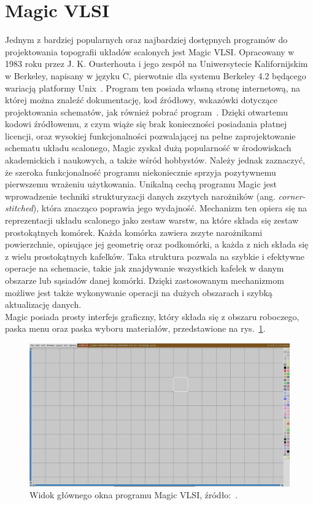 \section{Magic VLSI}

Jednym z bardziej popularnych oraz najbardziej dostępnych programów do projektowania topografii układów scalonych
jest Magic VLSI\@.
Opracowany w 1983 roku przez J. K. Ousterhouta i jego zespół na Uniwersytecie Kalifornijskim w Berkeley,
napisany w języku C, pierwotnie dla systemu Berkeley 4.2 będącego wariacją platformy Unix~\cite{MAGIC_article}.
Program ten posiada własną stronę internetową, na której można znaleźć dokumentację, kod źródłowy,
wskazówki dotyczące projektowania schematów, jak również pobrać program~\cite{MAGIC_site}.
Dzięki otwartemu kodowi źródłowemu, z czym wiąże się brak konieczności posiadania płatnej licencji,
oraz wysokiej funkcjonalności pozwalającej na pełne zaprojektowanie schematu układu scalonego,
Magic zyskał dużą popularność
w środowiskach akademickich i naukowych, a także wśród hobbystów.
Należy jednak zaznaczyć, że szeroka funkcjonalność programu
niekoniecznie sprzyja pozytywnemu pierwszemu wrażeniu użytkowania. %
\newpage
\indent Unikalną cechą programu Magic jest wprowadzenie techniki strukturyzacji danych
zszytych narożników (ang. \textit{corner-stitched}),
która znacząco poprawia jego wydajność.
Mechanizm ten opiera się na reprezentacji układu scalonego jako zestaw warstw,
na które składa się zestaw prostokątnych komórek.
Każda komórka zawiera zszyte narożnikami powierzchnie,
opisujące jej geometrię oraz podkomórki, a każda z nich składa się z wielu prostokątnych kafelków.
Taka struktura pozwala na szybkie i efektywne operacje na schemacie,
takie jak znajdywanie wszystkich kafelek w danym obszarze lub sąsiadów danej komórki.
Dzięki zastosowanym mechanizmom możliwe jest także wykonywanie operacji na dużych obszarach
i szybką aktualizację danych.\\
\indent Magic posiada prosty interfejs graficzny,
który składa się z obszaru roboczego, paska menu oraz paska wyboru materiałów,
przedstawione na rys.~\ref{fig:magic_okno}.

\begin{figure}[h]
    \centering
    \includegraphics[width=.9\textwidth]{chapters/chapter2/img/magic_okno}
    \caption[Widok głównego okna programu Magic VLSI.]{Widok głównego okna programu Magic VLSI, źródło:~\cite{MAGIC_site}.}
    \label{fig:magic_okno}
\end{figure}

